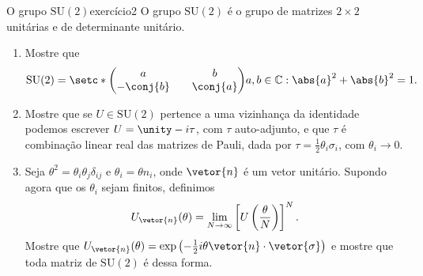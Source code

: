 \begin{exercício}{O grupo \(\mathrm{SU}(2)\)}{exercício2}
    O grupo \(\mathrm{SU}(2)\) é o grupo de matrizes \(2\times 2\) unitárias e de determinante unitário.
    \begin{enumerate}[label=(\alph*)]
        \item Mostre que
            \begin{equation*}
                \mathrm{SU}(2) = \setc*{\begin{pmatrix}
                    a && b\\
                    -\conj{b} && \conj{a}
                \end{pmatrix}}{a,b \in \mathbb{C} : \abs{a}^2 + \abs{b}^2 = 1}.
            \end{equation*}
        \item Mostre que se \(U \in \mathrm{SU}(2)\) pertence a uma vizinhança da identidade podemos escrever \(U = \unity - i \tau\), com \(\tau\) auto-adjunto, e que \(\tau\) é combinação linear real das matrizes de Pauli, dada por \(\tau = \frac12 \theta_i \sigma_i\), com \(\theta_i \to 0\).
        \item Seja \(\theta^2 = \theta_i \theta_j \delta_{ij}\) e \(\theta_i = \theta n_i\), onde \(\vetor{n}\) é um vetor unitário. Supondo agora que os \(\theta_i\) sejam finitos, definimos
            \begin{equation*}
                U_{\vetor{n}}(\theta) = \lim_{N\to \infty} \left[U\left(\frac{\theta}{N}\right)\right]^N.
            \end{equation*}
            Mostre que \(U_{\vetor{n}}(\theta) = \exp\left(-\frac12i\theta \vetor{n} \cdot \vetor{\sigma}\right)\) e mostre que toda matriz de \(\mathrm{SU}(2)\) é dessa forma.
    \end{enumerate}
\end{exercício}
